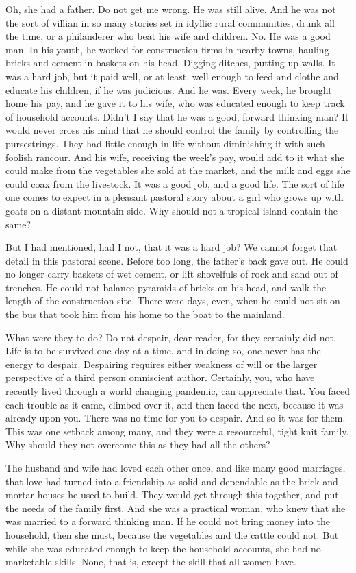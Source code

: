 \documentclass{amsart}
\begin{document}
Oh, she had a father. Do not get me wrong. He was still alive. And he was not the sort of villian in so many stories set in idyllic rural communities, drunk all the time, or a philanderer who beat his wife and children. No. He was a good man. In his youth, he worked for construction firms in nearby towns, hauling bricks and cement in baskets on his head. Digging ditches, putting up walls. It was a hard job, but it paid well, or at least, well enough to feed and clothe and educate his children, if he was judicious. And he was. Every week, he brought home his pay, and he gave it to his wife, who was educated enough to keep track of household accounts. Didn't I say that he was a good, forward thinking man? It would never cross his mind that he should control the family by controlling the pursestrings. They had little enough in life without diminishing it with such foolish rancour. And his wife, receiving the week's pay, would add to it what she could make from the vegetables she sold at the market, and the milk  and eggs she could coax from the livestock. It was a good job, and a good life. The sort of life one comes to expect in a pleasant pastoral story about a girl who grows up with goats on a distant mountain side. Why should not a tropical island contain the same?

But I had mentioned, had I not, that it was a hard job? We cannot forget that detail in this pastoral scene. Before too long, the father's back gave out. He could no longer carry baskets of wet cement, or lift shovelfuls of rock and sand out of trenches. He could not balance pyramids of bricks on his head, and walk the length of the construction site. There were days, even, when he could not sit on the bus that took him from his home to the boat to the mainland.

What were they to do? Do not despair, dear reader, for they certainly did not. Life is to be survived one day at a time, and in doing so, one never has the energy to despair. Despairing requires either weakness of will or the larger perspective of a third person omniscient author. Certainly, you, who have recently lived through a world changing pandemic, can appreciate that. You faced each trouble as it came, climbed over it, and then faced the next, because it was already upon you. There was no time for you to despair. And so it was for them. This was one setback among many, and they were a resourceful, tight knit family. Why should they not overcome this as they had all the others?

The husband and wife had loved each other once, and like many good marriages, that love had turned into a friendship as solid and dependable as the brick and mortar houses he used to build. They would get through this together, and put the needs of the family first. And she was a practical woman, who knew that she was married to a forward thinking man. If he could not bring money into the household, then she must, because the vegetables and the cattle could not. But while she was educated enough to keep the household accounts, she had no marketable skills. None, that is, except the skill that all women have. 
\end{document}

